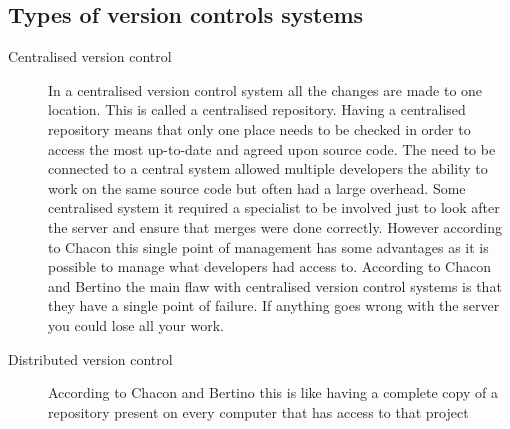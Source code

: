\subsection{Types of version controls systems}
\begin{description}

  \item [Centralised version control] 
  In a centralised version control system all the changes are made to one location.  This is called a centralised repository. Having a centralised repository means that only one place needs to be checked in order to access the most up-to-date and agreed upon source code. The need to be connected to a central system allowed multiple developers the ability to work on the same source code but often had a large overhead. Some centralised system it required a specialist to be involved just to look after the server and ensure that merges were done correctly. However according to Chacon \cite{Chacon2009} this single point of management has some advantages as it is possible to manage what developers had access to. According to Chacon \cite{Chacon2009} and Bertino \cite{Bertino2012} the main flaw with centralised version control systems is that they have a single point of failure. If anything goes wrong with the server you could lose all your work.

  \item [Distributed version control] 
  According to Chacon \cite{Chacon2009} and Bertino \cite{Bertino2012} this is like having a complete copy of a repository present on every computer that has access to that project


\end{description}
